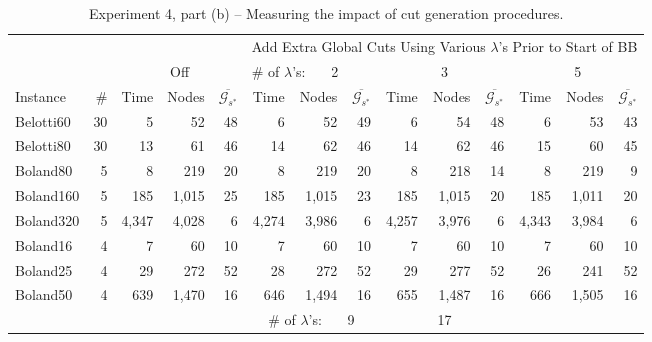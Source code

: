 \documentclass[11.5pt]{article}
\begin{document}
\begin{table}%
\small
\centering
\caption{Experiment 4, part (b) -- Measuring the impact of cut generation procedures.}\label{table_cuts2}
\begin{tabular}{l|r|rrr|rrrrrrrrr}
\toprule
 &  & \multicolumn{3}{c}{} & \multicolumn{9}{c}{Add Extra Global Cuts Using Various $\lambda$'s Prior to Start of BB} \\ 
 \cmidrule(r){6-14}
  &  & \multicolumn{3}{c}{Off} & \multicolumn{3}{l}{\# of $\lambda$'s:~~~ 2} & \multicolumn{3}{c}{3} & \multicolumn{3}{c}{5} \\
\cmidrule(r){3-5}
\cmidrule(r){6-8}
\cmidrule(r){9-11}
\cmidrule(r){12-14}
Instance & \# & Time & Nodes & $\overline{\mathcal{G}_{s^*}}$ & Time & Nodes & $\overline{\mathcal{G}_{s^*}}$ & Time & Nodes & $\overline{\mathcal{G}_{s^*}}$ & Time & Nodes & $\overline{\mathcal{G}_{s^*}}$   \\ 
\midrule
Belotti60 & 30 & 5 & 52 & 48 & 6 & 52 & 49 & 6 & 54 & 48 & 6 & 53 & 43 \\
Belotti80 & 30 & 13 & 61 & 46 & 14 & 62 & 46 & 14 & 62 & 46 & 15 & 60 & 45\\
\midrule
Boland80 & 5 & 8 & 219 & 20 & 8 & 219 & 20 & 8 & 218 & 14 & 8 & 219 & 9 \\
Boland160 & 5 & 185 & 1,015 & 25 & 185 & 1,015 & 23 & 185 & 1,015 & 20 & 185 & 1,011 & 20 \\
Boland320 & 5 & 4,347 & 4,028 & 6 & 4,274 & 3,986 & 6 & 4,257 & 3,976 & 6 & 4,343 & 3,984 & 6 \\
Boland16 & 4 & 7 & 60 & 10 & 7 & 60 & 10 & 7 & 60 & 10 & 7 & 60 & 10 \\
Boland25 & 4 & 29 & 272 & 52 & 28 & 272 & 52 & 29 & 277 & 52 & 26 & 241 & 52  \\
Boland50 & 4 & 639 & 1,470 & 16 & 646 & 1,494 & 16 & 655 & 1,487 & 16 & 666 & 1,505 & 16   \\
\midrule
\midrule
  &  & \multicolumn{3}{c}{}  & \multicolumn{3}{c}{\# of $\lambda$'s:~~~ 9} & \multicolumn{3}{c}{17}\\

\cmidrule(r){6-8}
\cmidrule(r){9-11}


\end{tabular}
\end{table}
\end{document}

